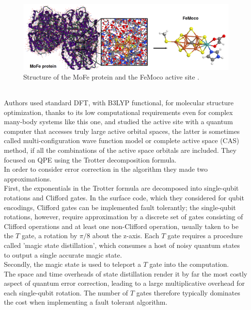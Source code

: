 \begin{figure}[ht]
  \centering
  \includegraphics[width=\textwidth]{figures/MoFe and FeMoco.png}
  \caption{Structure of the MoFe protein and the FeMoco active site \cite{Reiher2017Jul}.} \label{MoFe and FeMoco}
\end{figure} \\
Authors used standard DFT, with B3LYP functional, for molecular structure optimization, thanks to its low computational requirements even for complex many-body systems like this one, and studied the active site with a quantum computer that accesses truly large active orbital spaces, the latter is sometimes called multi-configuration wave function model or complete active space (CAS) method, if all the combinations of the active space orbitals are included. They focused on QPE using the Trotter decomposition formula. \\
In order to consider error correction in the algorithm they made two approximations. \\
First, the exponentials in the Trotter formula are decomposed into single-qubit rotations and Clifford gates. In the surface code, which they considered for qubit encodings, Clifford gates can be implemented fault tolerantly; the single-qubit rotations, however, require approximation by a discrete set of gates consisting of Clifford operations and at least one non-Clifford operation, usually taken to be the $T$ gate, a rotation by $\pi/8$ about the z-axis. Each $T$ gate requires a procedure called 'magic state distillation', which consumes a host of noisy quantum states to output a single accurate magic state. \\
Secondly, the magic state is used to teleport a $T$ gate into the computation. \\
The space and time overheads of state distillation render it by far the most costly aspect of quantum error correction, leading to a large multiplicative overhead for each single-qubit rotation. The number of $T$ gates therefore typically dominates the cost when implementing a fault tolerant algorithm. \\
